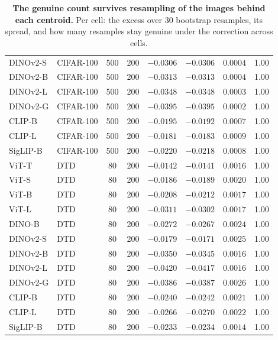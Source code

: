\begin{table}[H]
\begin{tabular}{llcccccc}
DINOv2-S & CIFAR-100 & 500 & 200 & $-0.0306$ & $-0.0306$ & $0.0004$ & 1.00 \\
DINOv2-B & CIFAR-100 & 500 & 200 & $-0.0313$ & $-0.0313$ & $0.0004$ & 1.00 \\
DINOv2-L & CIFAR-100 & 500 & 200 & $-0.0348$ & $-0.0348$ & $0.0003$ & 1.00 \\
DINOv2-G & CIFAR-100 & 500 & 200 & $-0.0395$ & $-0.0395$ & $0.0002$ & 1.00 \\
CLIP-B & CIFAR-100 & 500 & 200 & $-0.0195$ & $-0.0192$ & $0.0007$ & 1.00 \\
CLIP-L & CIFAR-100 & 500 & 200 & $-0.0181$ & $-0.0183$ & $0.0009$ & 1.00 \\
SigLIP-B & CIFAR-100 & 500 & 200 & $-0.0220$ & $-0.0218$ & $0.0008$ & 1.00 \\
\midrule
ViT-T & DTD & 80 & 200 & $-0.0142$ & $-0.0141$ & $0.0016$ & 1.00 \\
ViT-S & DTD & 80 & 200 & $-0.0186$ & $-0.0189$ & $0.0020$ & 1.00 \\
ViT-B & DTD & 80 & 200 & $-0.0208$ & $-0.0212$ & $0.0017$ & 1.00 \\
ViT-L & DTD & 80 & 200 & $-0.0311$ & $-0.0302$ & $0.0017$ & 1.00 \\
DINO-B & DTD & 80 & 200 & $-0.0272$ & $-0.0267$ & $0.0024$ & 1.00 \\
DINOv2-S & DTD & 80 & 200 & $-0.0179$ & $-0.0171$ & $0.0025$ & 1.00 \\
DINOv2-B & DTD & 80 & 200 & $-0.0350$ & $-0.0345$ & $0.0016$ & 1.00 \\
DINOv2-L & DTD & 80 & 200 & $-0.0420$ & $-0.0417$ & $0.0016$ & 1.00 \\
DINOv2-G & DTD & 80 & 200 & $-0.0386$ & $-0.0387$ & $0.0026$ & 1.00 \\
CLIP-B & DTD & 80 & 200 & $-0.0240$ & $-0.0242$ & $0.0021$ & 1.00 \\
CLIP-L & DTD & 80 & 200 & $-0.0266$ & $-0.0270$ & $0.0022$ & 1.00 \\
SigLIP-B & DTD & 80 & 200 & $-0.0233$ & $-0.0234$ & $0.0014$ & 1.00 \\
\bottomrule
\end{tabular}
\par\vspace{2pt}
\endgroup
\caption{\textbf{The genuine count survives resampling of the images behind each centroid.} Per cell: the excess over 30 bootstrap resamples, its spread, and how many resamples stay genuine under the correction across cells.
}
\label{tab:q8-robust}\label{tab:q8-robust-b}
\end{table}
